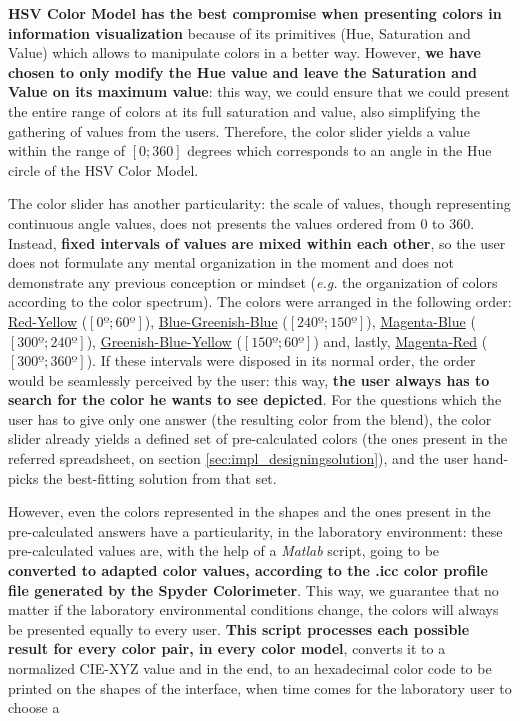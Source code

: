 \textbf{HSV Color Model has the best compromise when presenting colors in information visualization} because of its primitives (Hue, Saturation and Value)
which allows to manipulate colors in a better way. However, \textbf{we have chosen to only modify the Hue value and leave the Saturation and Value on its
maximum value}: this way, we could ensure that we could present the entire range of colors at its full saturation and value, also simplifying the gathering
of values from the users. Therefore, the color slider yields a value within the range of $[0 ; 360]$ degrees which corresponds to an angle in the Hue circle
of the HSV Color Model. \par
%
The color slider has another particularity: the scale of values, though representing continuous angle values, does not presents the values ordered from 0 to 360.
Instead, \textbf{fixed intervals of values are mixed within each other}, so the user does not formulate any mental organization in the moment and does not demonstrate any previous conception or mindset
(\emph{e.g.} the organization of colors according to the color spectrum). The colors were arranged in the following order: \ul{Red-Yellow} ($[0º; 60º]$),
\ul{Blue-Greenish-Blue} ($[240º; 150º]$), \ul{Magenta-Blue} ($[300º; 240º]$), \ul{Greenish-Blue-Yellow} ($[150º; 60º]$) and, lastly, \ul{Magenta-Red} ($[300º; 360º]$). If these
intervals were disposed in its normal order, the order would be seamlessly perceived by the user: this way, \textbf{the user always has to search for the
color he wants to see depicted}. For the questions which the user has to give only one answer (the resulting color from the blend), the color slider
already yields a defined set of pre-calculated colors (the ones present in the referred spreadsheet, on section \ref{sec:impl_designingsolution}), and the
user hand-picks the best-fitting solution from that set. \par
%
However, even the colors represented in the shapes and the ones present in the pre-calculated answers have a particularity, in the laboratory environment: these
pre-calculated values are, with the help of a \emph{Matlab} script, going to be \textbf{converted to adapted color values, according to the .icc color profile
file generated by the Spyder Colorimeter}. This way, we guarantee that no matter if the laboratory environmental conditions change, the colors will always be
presented equally to every user. \textbf{This script processes each possible result for every color pair, in every color model}, converts it to a normalized
CIE-XYZ value and in the end, to an hexadecimal color code to be printed on the shapes of the interface, when time comes for the laboratory user to choose a
